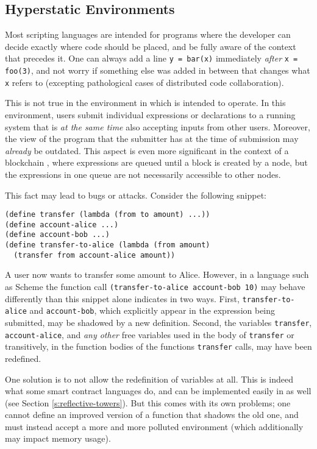\subsection{Hyperstatic Environments}
\label{s:hyperstatic}

Most scripting languages are intended for programs where the developer can
decide exactly where code should be placed, and be fully aware of the context
that precedes it. One can always add a line \texttt{y = bar(x)} immediately
\emph{after} \texttt{x = foo(3)}, and not worry if something else was
added in between that changes what \texttt{x} refers to (excepting pathological
cases of distributed code collaboration).

This is not true in the environment in which \rad{} is intended to operate. In this
environment, users submit individual expressions or declarations to a running
system that is \emph{at the same time} also accepting inputs from other users.
Moreover, the view of the program that the submitter has at the time of
submission may \emph{already} be outdated. This aspect is even more significant
in the context of a blockchain \cite{Nakamoto2008}, where expressions are
queued until a block is created by a node, but the expressions in one queue are not
necessarily accessible to other nodes.

This fact may lead to bugs or attacks. Consider the following snippet:
\begin{lstlisting}
(define transfer (lambda (from to amount) ...))
(define account-alice ...)
(define account-bob ...)
(define transfer-to-alice (lambda (from amount)
  (transfer from account-alice amount))
\end{lstlisting}
A user now wants to transfer some amount to Alice. However, in a language such
as Scheme the function call \texttt{(transfer-to-alice account-bob 10)} may
behave differently than this snippet alone indicates in two ways. First,
\texttt{transfer-to-alice} and \texttt{account-bob}, which explicitly appear in
the expression being submitted, may be shadowed by a new definition. Second, the
variables \texttt{transfer}, \texttt{account-alice}, and \emph{any other} free
variables used in the body of \texttt{transfer} or transitively, in the function
bodies of the functions \texttt{transfer} calls, may have been redefined.

One solution is to not allow the redefinition of variables at all. This is
indeed what some smart contract \cite{Szabo94} languages do, and can be implemented easily in
\rad{} as well (see Section \ref{s:reflective-towers}). But this comes with its
own problems; one cannot define an improved version of a function that shadows
the old one, and must instead accept a more and more polluted environment (which
additionally may impact memory usage).

